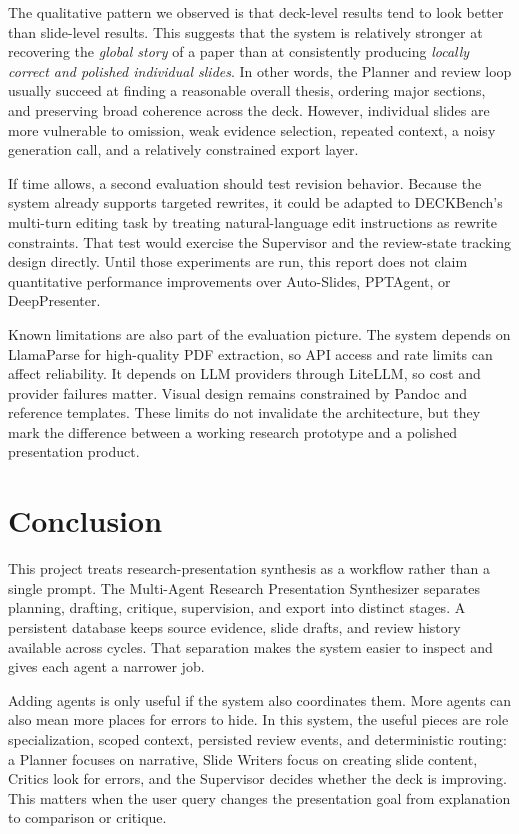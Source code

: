 \documentclass[11pt]{article}
\begin{document}
The qualitative pattern we observed is that deck-level results tend to look better than slide-level results. This suggests that the system is relatively stronger at recovering the \emph{global story} of a paper than at consistently producing \emph{locally correct and polished individual slides}. In other words, the Planner and review loop usually succeed at finding a reasonable overall thesis, ordering major sections, and preserving broad coherence across the deck. However, individual slides are more vulnerable to omission, weak evidence selection, repeated context, a noisy generation call, and a relatively constrained export layer.

If time allows, a second evaluation should test revision behavior. Because the system already supports targeted rewrites, it could be adapted to DECKBench's multi-turn editing task by treating natural-language edit instructions as rewrite constraints. That test would exercise the Supervisor and the review-state tracking design directly. Until those experiments are run, this report does not claim quantitative performance improvements over Auto-Slides, PPTAgent, or DeepPresenter.

Known limitations are also part of the evaluation picture. The system depends on LlamaParse for high-quality PDF extraction, so API access and rate limits can affect reliability. It depends on LLM providers through LiteLLM, so cost and provider failures matter. Visual design remains constrained by Pandoc and reference templates. These limits do not invalidate the architecture, but they mark the difference between a working research prototype and a polished presentation product.

\section{Conclusion}

This project treats research-presentation synthesis as a workflow rather than a single prompt. The Multi-Agent Research Presentation Synthesizer separates planning, drafting, critique, supervision, and export into distinct stages. A persistent database keeps source evidence, slide drafts, and review history available across cycles. That separation makes the system easier to inspect and gives each agent a narrower job.

Adding agents is only useful if the system also coordinates them. More agents can also mean more places for errors to hide. In this system, the useful pieces are role specialization, scoped context, persisted review events, and deterministic routing: a Planner focuses on narrative, Slide Writers focus on creating slide content, Critics look for errors, and the Supervisor decides whether the deck is improving. This matters when the user query changes the presentation goal from explanation to comparison or critique.
\end{document}
